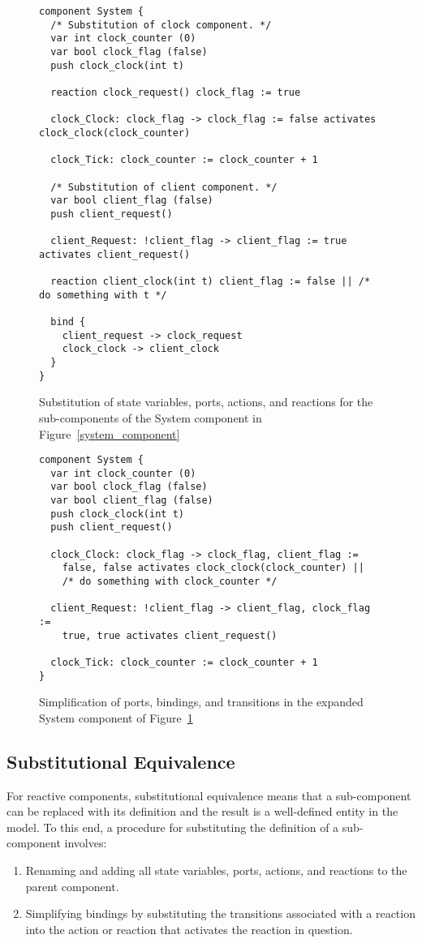 \begin{figure}
\begin{verbatim}
component System {
  /* Substitution of clock component. */
  var int clock_counter (0)
  var bool clock_flag (false)
  push clock_clock(int t)

  reaction clock_request() clock_flag := true

  clock_Clock: clock_flag -> clock_flag := false activates clock_clock(clock_counter)

  clock_Tick: clock_counter := clock_counter + 1

  /* Substitution of client component. */
  var bool client_flag (false)
  push client_request()

  client_Request: !client_flag -> client_flag := true activates client_request()

  reaction client_clock(int t) client_flag := false || /* do something with t */

  bind {
    client_request -> clock_request
    clock_clock -> client_clock
  }
}
\end{verbatim}
\caption{Substitution of state variables, ports, actions, and reactions for the sub-components of the System component in Figure~\ref{system_component}}
\label{se1}
\end{figure}

\begin{figure}
\begin{verbatim}
component System {
  var int clock_counter (0)
  var bool clock_flag (false)
  var bool client_flag (false)
  push clock_clock(int t)
  push client_request()

  clock_Clock: clock_flag -> clock_flag, client_flag :=
    false, false activates clock_clock(clock_counter) ||
    /* do something with clock_counter */

  client_Request: !client_flag -> client_flag, clock_flag :=
    true, true activates client_request()

  clock_Tick: clock_counter := clock_counter + 1
}
\end{verbatim}
\caption{Simplification of ports, bindings, and transitions in the expanded System component of Figure~\ref{se1}}
\label{se2}
\end{figure}

\subsection{Substitutional Equivalence}
\label{substitutional_equivalence}
For reactive components, substitutional equivalence means that a sub-component can be replaced with its definition and the result is a well-defined entity in the model.
To this end, a procedure for substituting the definition of a sub-component involves:
\begin{enumerate}
\item Renaming and adding all state variables, ports, actions, and reactions to the parent component.
\item Simplifying bindings by substituting the transitions associated with a reaction into the action or reaction that activates the reaction in question.
\end{enumerate}

